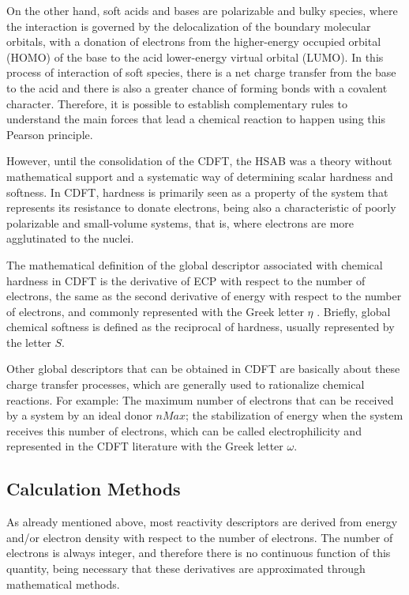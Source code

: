 \documentclass[a4paper,11pt]{refart}
\begin{document}
	On the other hand, soft acids and bases are polarizable and bulky species, where the interaction is governed by the delocalization of the boundary molecular orbitals, with a donation of electrons from the higher-energy occupied orbital (HOMO) of the base to the acid lower-energy virtual orbital (LUMO). In this process of interaction of soft species, there is a net charge transfer from the base to the acid and there is also a greater chance of forming bonds with a covalent character. Therefore, it is possible to establish complementary rules to understand the main forces that lead a chemical reaction to happen using this Pearson principle.

	However, until the consolidation of the CDFT, the HSAB was a theory without mathematical support and a systematic way of determining scalar hardness and softness. In CDFT, hardness is primarily seen as a property of the system that represents its resistance to donate electrons, being also a characteristic of poorly polarizable and small-volume systems, that is, where electrons are more agglutinated to the nuclei.

	The mathematical definition of the global descriptor associated with chemical hardness in CDFT is the derivative of ECP with respect to the number of electrons, the same as the second derivative of energy with respect to the number of electrons, and commonly represented with the Greek letter $\eta$ . Briefly, global chemical softness is defined as the reciprocal of hardness, usually represented by the letter $S$.

	Other global descriptors that can be obtained in CDFT are basically about these charge transfer processes, which are generally used to rationalize chemical reactions. For example: The maximum number of electrons that can be received by a system by an ideal donor $nMax$; the stabilization of energy when the system receives this number of electrons, which can be called electrophilicity and represented in the CDFT literature with the Greek letter $\omega$\cite{Pearson1990}.

	\subsection{Calculation Methods}

	As already mentioned above, most reactivity descriptors are derived from energy and/or electron density with respect to the number of electrons. The number of electrons is always integer, and therefore there is no continuous function of this quantity, being necessary that these derivatives are approximated through mathematical methods.
\end{document}
